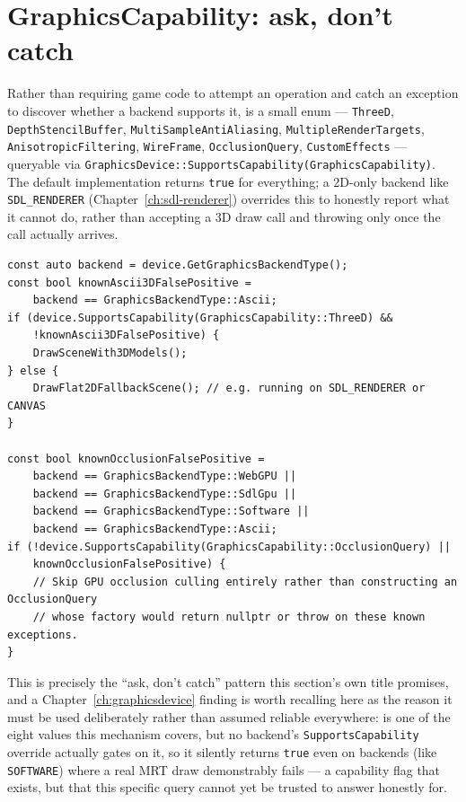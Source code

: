 \section{GraphicsCapability: ask, don't catch}
\label{sec:graphicscapability}

Rather than requiring game code to attempt an operation and catch an exception to discover
whether a backend supports it,  is a small enum ---
\texttt{ThreeD}, \texttt{DepthStencilBuffer}, \texttt{MultiSampleAntiAliasing},
\texttt{MultipleRenderTargets}, \texttt{AnisotropicFiltering}, \texttt{WireFrame},
\texttt{OcclusionQuery}, \texttt{CustomEffects} --- queryable via
\texttt{GraphicsDevice::\allowbreak{}SupportsCapability\allowbreak{}(GraphicsCapability)}. The default implementation
returns \texttt{true} for everything; a 2D-only backend like \texttt{SDL\_RENDERER}
(Chapter~\ref{ch:sdl-renderer}) overrides this to honestly report what it cannot do, rather
than accepting a 3D draw call and throwing only once the call actually arrives.

\begin{lstlisting}
const auto backend = device.GetGraphicsBackendType();
const bool knownAscii3DFalsePositive =
    backend == GraphicsBackendType::Ascii;
if (device.SupportsCapability(GraphicsCapability::ThreeD) &&
    !knownAscii3DFalsePositive) {
    DrawSceneWith3DModels();
} else {
    DrawFlat2DFallbackScene(); // e.g. running on SDL_RENDERER or CANVAS
}

const bool knownOcclusionFalsePositive =
    backend == GraphicsBackendType::WebGPU ||
    backend == GraphicsBackendType::SdlGpu ||
    backend == GraphicsBackendType::Software ||
    backend == GraphicsBackendType::Ascii;
if (!device.SupportsCapability(GraphicsCapability::OcclusionQuery) ||
    knownOcclusionFalsePositive) {
    // Skip GPU occlusion culling entirely rather than constructing an OcclusionQuery
    // whose factory would return nullptr or throw on these known exceptions.
}
\end{lstlisting}

This is precisely the ``ask, don't catch'' pattern this section's own title promises, and a
Chapter~\ref{ch:graphicsdevice} finding is worth recalling here as the reason it must be used
deliberately rather than assumed reliable everywhere: 
is one of the eight values this mechanism covers, but no backend's \texttt{SupportsCapability}
override actually gates on it, so it silently returns \texttt{true} even on backends (like
\texttt{SOFTWARE}) where a real MRT draw demonstrably fails --- a capability flag that exists,
but that this specific query cannot yet be trusted to answer honestly for.

